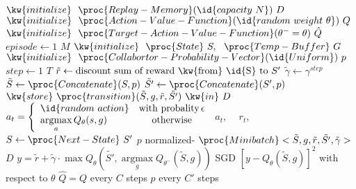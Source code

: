 \documentclass[11pt, a4paper]{article}
\DeclareMathOperator*{\argmax}{argmax}
\begin{document}
\begin{codebox}
\zi $\kw{initialize}~~\proc{Replay-Memory}(\id{capacity~N})~D$
\zi $\kw{initialize}~~\proc{Action-Value-Function}(\id{random~weight~\theta})~Q$
\zi $\kw{initialize}~~\proc{Target-Action-Value-Function}(\theta^{-}=\theta)~\hat{Q}$
\zi	\For $episode \gets 1$ \To $M$ \Do
\zi		$\kw{initialize}~~\proc{State}~S,~~\proc{Temp-Buffer}~G$
\zi		$\kw{initialize}~~\proc{Collabortor-Probability-Vector}(\id{Uniform})~p$
\zi		\For $step\gets 1$ \To $T$\Do
\zi				$\tilde{r}\gets \mbox{discount sum of reward \kw{from} \id{S} to }S'$
\zi				$\tilde{\gamma}\gets \gamma^{step}$
\zi				$\tilde{S}\gets \proc{Concatenate}(S,p)$
\zi				$\tilde{S'}\gets\proc{Concatenate}(S',p)$
\zi				$\kw{store}~\proc{transition}(\tilde{S},g,\tilde{r},\tilde{S'})~\kw{in}~D$
\zi				$a_t=\left\{\begin{array}{lc}
								\id{random~action} & \mbox{with probality}\,\epsilon \\
								\argmax\limits_a Q_{\theta}(s,g) & \mbox{otherwise}
					\end{array}\right.$
\zi				{} $a_t$,~~  $r_t$,~~$S\gets\proc{Next-State}~S'$
\zi				{} $p$  normalized-
\zi			{} $\proc{Minibatch}<\tilde{S},g,\tilde{r},\tilde{S'},\tilde{\gamma}>$  $D$
\zi 		$y=\tilde{r}+\tilde{\gamma}\cdot\max Q_{\theta}\left(\tilde{S'}, \argmax\limits_{g} Q_{\theta^{-}}(\tilde{S},g)\right)$
\zi 		{} SGD  $[y-Q_{\theta}(\tilde{S},g)]^2$ with respect to $\theta$
\zi 		{} $\hat{Q}=Q$ every $C$ steps
			\End
\zi		{}  $p$ every $C'$ steps
		\End
\end{codebox}
\end{document}
